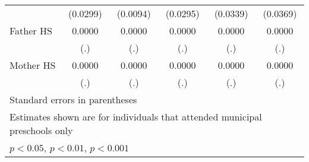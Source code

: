 \begin{table}[htbp]
\begin{tabular}{l*{5}{c}}
            &    (0.0299)         &    (0.0094)         &    (0.0295)         &    (0.0339)         &    (0.0369)         \\
\addlinespace
Father HS   &      0.0000         &      0.0000         &      0.0000         &      0.0000         &      0.0000         \\
            &         (.)         &         (.)         &         (.)         &         (.)         &         (.)         \\
\addlinespace
Mother HS   &      0.0000         &      0.0000         &      0.0000         &      0.0000         &      0.0000         \\
            &         (.)         &         (.)         &         (.)         &         (.)         &         (.)         \\
\bottomrule
\multicolumn{6}{l}{\footnotesize Standard errors in parentheses}\\
\multicolumn{6}{l}{\footnotesize Estimates shown are for individuals that attended municipal preschools only}\\
\multicolumn{6}{l}{\footnotesize \sym{*} \(p<0.05\), \sym{**} \(p<0.01\), \sym{***} \(p<0.001\)}\\
\end{tabular}
\end{table}
